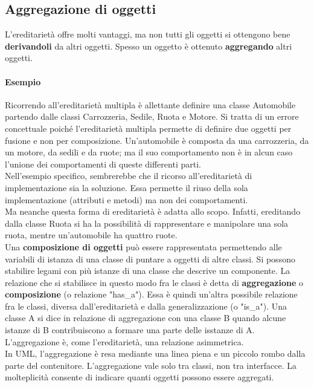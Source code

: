 \documentclass{article}
\begin{document}
	\subsection{Aggregazione di oggetti}
	L'ereditarietà offre molti vantaggi, ma non tutti gli oggetti si ottengono bene \textbf{derivandoli} da altri oggetti. Spesso un oggetto è ottenuto \textbf{aggregando} altri oggetti.
	\paragraph*{Esempio}
	Ricorrendo all'ereditarietà multipla è allettante definire una classe Automobile partendo dalle classi Carrozzeria, Sedile, Ruota e Motore. Si tratta di un errore concettuale poiché l'ereditarietà multipla permette di definire due oggetti per fusione e non per composizione. Un'automobile è composta da una carrozzeria, da un motore, da sedili e da ruote; ma il suo comportamento non è in alcun caso l'unione dei comportamenti di queste differenti parti.
	\vspace{\baselineskip} \\
	Nell'esempio specifico, sembrerebbe che il ricorso all'ereditarietà di implementazione sia la soluzione. Essa permette il riuso della sola implementazione (attributi e metodi) ma non dei comportamenti. \\
	Ma neanche questa forma di ereditarietà è adatta allo scopo. Infatti, ereditando dalla classe Ruota si ha la possibilità di rappresentare e manipolare una sola ruota, mentre un'automobile ha quattro ruote.
	\vspace{\baselineskip} \\
	Una \textbf{composizione di oggetti} può essere rappresentata permettendo alle variabili di istanza di una classe di puntare a oggetti di altre classi. Si possono stabilire legami con più istanze di una classe che descrive un componente. La relazione che si stabilisce in questo modo fra le classi è detta di \textbf{aggregazione} o \textbf{composizione} (o relazione "has\_a"). Essa è quindi un'altra possibile relazione fra le classi, diversa dall'ereditarietà e dalla generalizzazione (o "is\_a"). Una classe A si dice in relazione di aggregazione con una classe B quando alcune istanze di B contribuiscono a formare una parte delle isstanze di A. L'aggregazione è, come l'ereditarietà, una relazione asimmetrica.
	\vspace{\baselineskip} \\
	In UML, l'aggregazione è resa mediante una linea piena e un piccolo rombo dalla parte del contenitore. L'aggregazione vale solo tra classi, non tra interfacce. La molteplicità consente di indicare quanti oggetti possono essere aggregati.
\end{document}
